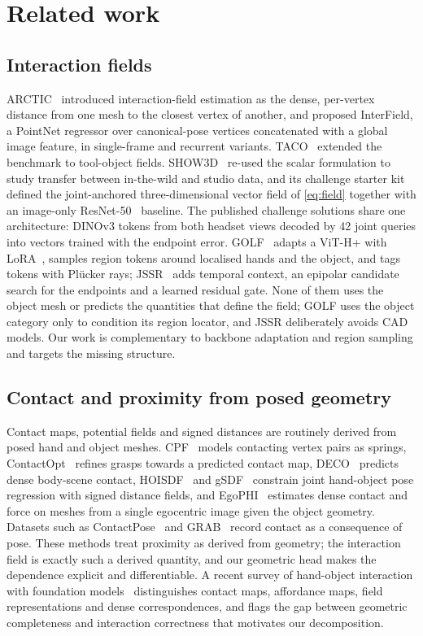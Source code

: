 \section{Related work}
\label{sec:related}

\subsection{Interaction fields}
ARCTIC~\cite{fan2023arctic} introduced interaction-field estimation as the dense, per-vertex distance from one mesh to the closest vertex of another, and proposed InterField, a PointNet regressor over canonical-pose vertices concatenated with a global image feature, in single-frame and recurrent variants. TACO~\cite{liu2024taco} extended the benchmark to tool-object fields. SHOW3D~\cite{rim2026show3d} re-used the scalar formulation to study transfer between in-the-wild and studio data, and its challenge starter kit~\cite{rim2026show3dapi} defined the joint-anchored three-dimensional vector field of \cref{eq:field} together with an image-only ResNet-50~\cite{he2016resnet} baseline. The published challenge solutions share one architecture: DINOv3 tokens from both headset views decoded by 42 joint queries into vectors trained with the endpoint error. GOLF~\cite{zou2026golf} adapts a ViT-H+ with LoRA~\cite{hu2022lora}, samples region tokens around localised hands and the object, and tags tokens with Pl\"ucker rays; JSSR~\cite{jin2026jssr} adds temporal context, an epipolar candidate search for the endpoints and a learned residual gate. None of them uses the object mesh or predicts the quantities that define the field; GOLF uses the object category only to condition its region locator, and JSSR deliberately avoids CAD models. Our work is complementary to backbone adaptation and region sampling and targets the missing structure.

\subsection{Contact and proximity from posed geometry}
Contact maps, potential fields and signed distances are routinely derived from posed hand and object meshes. CPF~\cite{yang2021cpf} models contacting vertex pairs as springs, ContactOpt~\cite{grady2021contactopt} refines grasps towards a predicted contact map, DECO~\cite{tripathi2023deco} predicts dense body-scene contact, HOISDF~\cite{qi2024hoisdf} and gSDF~\cite{chen2023gsdf} constrain joint hand-object pose regression with signed distance fields, and EgoPHI~\cite{ilic2026egophi} estimates dense contact and force on meshes from a single egocentric image given the object geometry. Datasets such as ContactPose~\cite{brahmbhatt2020contactpose} and GRAB~\cite{taheri2020grab} record contact as a consequence of pose. These methods treat proximity as derived from geometry; the interaction field is exactly such a derived quantity, and our geometric head makes the dependence explicit and differentiable. A recent survey of hand-object interaction with foundation models~\cite{lin2026hoisurvey} distinguishes contact maps, affordance maps, field representations and dense correspondences, and flags the gap between geometric completeness and interaction correctness that motivates our decomposition.

